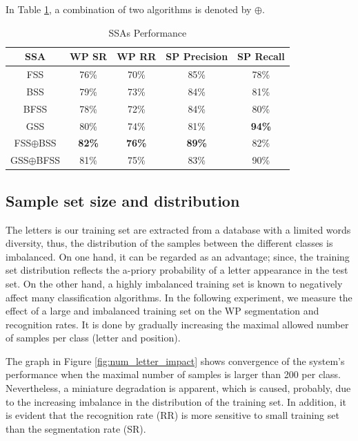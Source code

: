 \documentclass[10pt, conference, compsocconf]{IEEEtran}
\begin{document}
In Table \ref{table:ss_algorithms_results}, a combination of two algorithms is denoted by $\oplus$.

\begin{table}[b]
\caption{SSAs Performance}
\renewcommand{\arraystretch}{1.2}
\begin{tabular}{ | c | c | c | c | c |}
\hline
\textbf{SSA} & \textbf{WP SR} & \textbf{WP RR} & S\textbf{P Precision} & \textbf{SP Recall}\\
\hline                 
  FSS & 76\% & 70\% & 85\% & 78\% \\ 
  \hline
  BSS & 79\% &  73\% & 84\%& 81\% \\
  \hline
  BFSS & 78\% & 72\% & 84\% & 80\%\\ 
  \hline
  GSS & 80\% & 74\% & 81\% & \bf{94}\% \\  
  \hline
  FSS$\oplus$BSS & \bf{82}\% & \bf{76}\% & \bf{89}\% & 82\%\\  
  \hline
  GSS$\oplus$BFSS & 81\% & 75\% & 83\% & 90\% \\
  \hline
\end{tabular}
\centering
\label{table:ss_algorithms_results} 
\end{table}

\subsection{Sample set size and distribution}
The letters is our training set are extracted from a database with a limited words diversity, thus, the distribution of the samples between the different classes is imbalanced. 
On one hand, it can be regarded as an advantage; since, the training set distribution reflects the a-priory probability of a letter appearance in the test set. 
On the other hand, a highly imbalanced training set is known to negatively affect many classification algorithms.
In the following experiment, we measure the effect of a large and imbalanced training set on the WP segmentation and recognition rates. 
It is done by gradually increasing the maximal allowed number of samples per class (letter and position).
 
The graph in Figure \ref{fig:num_letter_impact} shows convergence of the system's performance when the maximal number of samples is larger than 200 per class. 
Nevertheless, a miniature degradation is apparent, which is caused, probably, due to the increasing imbalance in the distribution of the training set.
In addition, it is evident that the recognition rate (RR) is more sensitive to small training set than the segmentation rate (SR).
\end{document}
